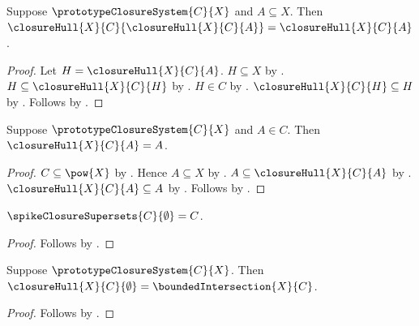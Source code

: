\begin{proposition}\label{spike_closure_hull_idempotent}
    Suppose $\prototypeClosureSystem{C}{X}$ and $A\subseteq X$.
    Then
        $\closureHull{X}{C}{\closureHull{X}{C}{A}}
            =\closureHull{X}{C}{A}$.
\end{proposition}
\begin{proof}
    Let $H=\closureHull{X}{C}{A}$.
    $H\subseteq X$ by .
    $H\subseteq\closureHull{X}{C}{H}$ by
        .
    $H\in C$ by .
    $\closureHull{X}{C}{H}\subseteq H$ by
        .
    Follows by .
\end{proof}

\begin{proposition}\label{spike_closure_hull_already_closed}
    Suppose $\prototypeClosureSystem{C}{X}$ and $A\in C$.
    Then $\closureHull{X}{C}{A}=A$.
\end{proposition}
\begin{proof}
    $C\subseteq\pow{X}$ by
        .
    Hence $A\subseteq X$ by .
    $A\subseteq\closureHull{X}{C}{A}$ by
        .
    $\closureHull{X}{C}{A}\subseteq A$ by
        .
    Follows by .
\end{proof}

\begin{proposition}\label{spike_empty_closure_supersets}
    $\spikeClosureSupersets{C}{\emptyset}=C$.
\end{proposition}
\begin{proof}
    Follows by
        .
\end{proof}

\begin{proposition}\label{spike_closure_hull_empty}
    Suppose $\prototypeClosureSystem{C}{X}$.
    Then
        $\closureHull{X}{C}{\emptyset}
            =\boundedIntersection{X}{C}$.
\end{proposition}
\begin{proof}
    Follows by
        .
\end{proof}
